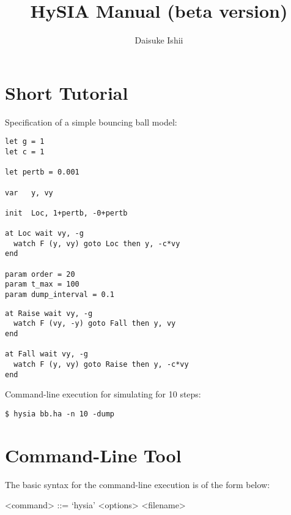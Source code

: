 \documentclass[10pt,a4paper]{article}
\begin{document}
\title{HySIA Manual (beta version)}
\author{Daisuke Ishii}

\maketitle

\setlength{\grammarparsep}{8pt plus 1pt minus 1pt} %
\setlength{\grammarindent}{8em} %

\section{Short Tutorial}

Specification of a simple bouncing ball model:
\begin{lstlisting}
let g = 1
let c = 1

let pertb = 0.001

var   y, vy

init  Loc, 1+pertb, -0+pertb

at Loc wait vy, -g
  watch F (y, vy) goto Loc then y, -c*vy
end

param order = 20
param t_max = 100
param dump_interval = 0.1
\end{lstlisting}

\begin{lstlisting}
at Raise wait vy, -g
  watch F (vy, -y) goto Fall then y, vy
end

at Fall wait vy, -g
  watch F (y, vy) goto Raise then y, -c*vy
end
\end{lstlisting}

Command-line execution for simulating for 10 steps:
\begin{verbatim}
$ hysia bb.ha -n 10 -dump
\end{verbatim}


\section{Command-Line Tool}

The basic syntax for the command-line execution is of the form below:
\begin{grammar}
<command> ::= `hysia' <options> <filename>
\end{grammar}
\end{document}
